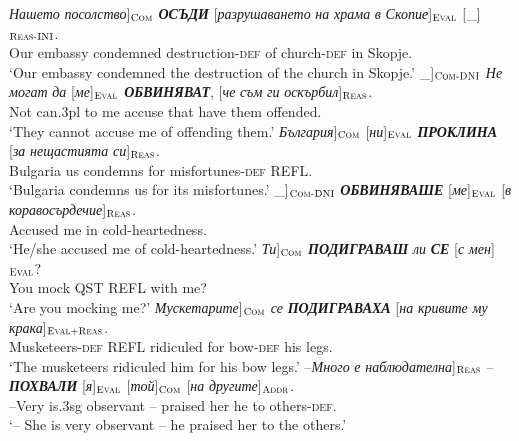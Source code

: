 \documentclass[output=paper,colorlinks,citecolor=brown]{langscibook}
\begin{document}
\begin{exe}
\ex \label{ex:06judgmentbg}
\begin{xlist}
\ex  \label{ex:06judgmentbg:a}
\gll {[}\textit{Нашето} \textit{посолство}{]}$_{\text{\textsc{Com}}}$ \textit{\textbf{ОСЪДИ}} [\textit{разрушаването} \textit{на} \textit{храма} \textit{в} \textit{Скопие}]$_{\text{\textsc{Eval}}}$ {[}\_{]}$_{\text{\textsc{Reas-INI}}}$. 
\\
Our embassy condemned destruction-\textsc{def} of church-\textsc{def} in Skopje. {}
 \\
 \glt `Our embassy condemned the destruction of the church in Skopje.'
\ex  \label{ex:06judgmentbg:b}
\gll {[}\_{]}$_{\text{\textsc{Com-DNI}}}$ \textit{Не} \textit{могат} \textit{да} [\textit{ме}]$_{\text{\textsc{Eval}}}$ \textit{\textbf{ОБВИНЯВАТ}}, [\textit{че} \textit{съм} \textit{ги} \textit{оскърбил}]$_{\text{\textsc{Reas}}}$.
 \\
 {} Not can.3pl to me accuse that have them offended.
 \\
 \glt `They cannot accuse me of offending them.'
\ex  \label{ex:06judgmentbg:c}
\gll {[}\textit{България}{]}$_{\text{\textsc{Com}}}$ [\textit{ни}]$_{\text{\textsc{Eval}}}$ \textit{\textbf{ПРОКЛИНА}} [\textit{за} \textit{нещастията} \textit{си}]$_{\text{\textsc{Reas}}}$.
 \\
Bulgaria us condemns for misfortunes-\textsc{def}  REFL.
 \\
 \glt `Bulgaria condemns us for its misfortunes.'
\ex  \label{ex:06judgmentbg:d}
\gll {[}\_{]}$_{\text{\textsc{Com-DNI}}}$ \textit{\textbf{ОБВИНЯВАШЕ}} [\textit{ме}]$_{\text{\textsc{Eval}}}$ [\textit{в} \textit{коравосърдечие}]$_{\text{\textsc{Reas}}}$.
 \\
{} Accused me in cold-heartedness. {}
 \\
 \glt `He/she accused me of cold-heartedness.'
\ex  \label{ex:06judgmentbg:e}
\gll {[}\textit{Ти}{]}$_{\text{\textsc{Com}}}$ \textit{\textbf{ПОДИГРАВАШ}} \textit{ли} \textit{\textbf{СЕ}} [\textit{с} \textit{мен}]$_{\text{\textsc{Eval}}}$?
 \\
 You mock QST REFL with me?
 \\
 \glt `Are you mocking me?'
\ex  \label{ex:06judgmentbg:f}
\gll {[}\textit{Мускетарите}{]}$_{\text{\textsc{Com}}}$ \textit{се} \textit{\textbf{ПОДИГРАВАХА}} [\textit{на} \textit{кривите} \textit{му} \textit{крака}]$_{\text{\textsc{Eval+Reas}}}$.
 \\
Musketeers-\textsc{def}  REFL ridiculed for bow-\textsc{def} his legs.
 \\
 \glt `The musketeers ridiculed him for his bow legs.'
\ex  \label{ex:06judgmentbg:g}
\gll {[}--\textit{Много} \textit{е} \textit{наблюдателна}{]}$_{\text{\textsc{Reas}}}$ -- \textit{\textbf{ПОХВАЛИ}} [\textit{я}]$_{\text{\textsc{Eval}}}$ [\textit{той}]$_{\text{\textsc{Com}}}$ [\textit{на} \textit{другите}]$_{\text{\textsc{Addr}}}$.
 \\
 --Very is.3sg observant -- praised her he to others-\textsc{def}.
 \\
 \glt `-- She is very observant -- he praised her to the others.'
\end{xlist}
\end{exe}
\end{document}
